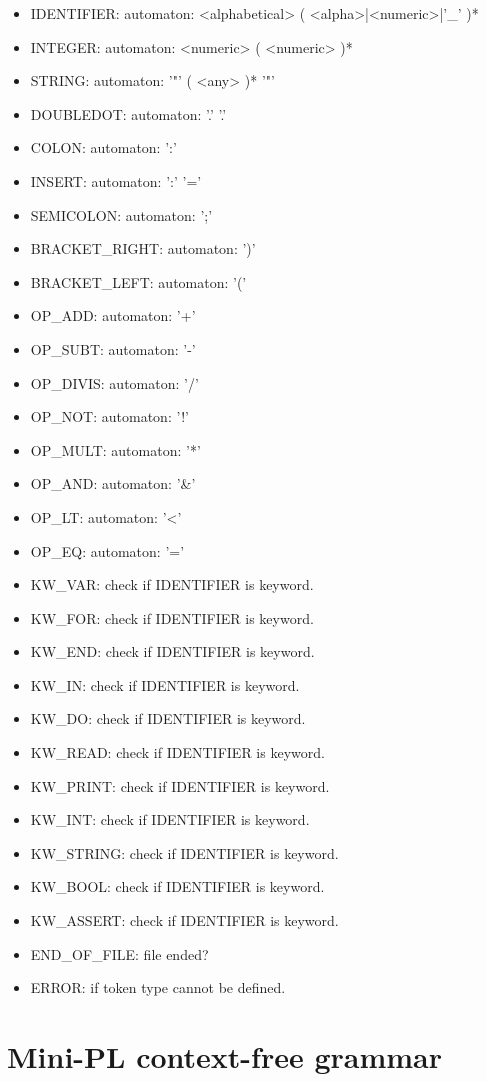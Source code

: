 \documentclass[english,11pt,twoside,a4paper]{article}
\begin{document}
\begin{itemize}
	\item IDENTIFIER: automaton: <alphabetical> ( <alpha>|<numeric>|'\_' )*
	\item INTEGER: automaton: <numeric> ( <numeric> )*
	\item STRING: automaton: '"' ( <any> )* '"'
	\item DOUBLEDOT: automaton: '.' '.'
	\item COLON: automaton: ':'
	\item INSERT: automaton: ':' '='
	\item SEMICOLON: automaton: ';'
	\item BRACKET\_RIGHT: automaton: ')'
	\item BRACKET\_LEFT: automaton: '('
	\item OP\_ADD: automaton: '+'
	\item OP\_SUBT: automaton: '-'
	\item OP\_DIVIS: automaton: '/'
	\item OP\_NOT: automaton: '!'
	\item OP\_MULT: automaton: '*'
	\item OP\_AND: automaton: '\&'
	\item OP\_LT: automaton: '<'
	\item OP\_EQ: automaton: '='
	\item KW\_VAR: check if IDENTIFIER is keyword.
	\item KW\_FOR: check if IDENTIFIER is keyword.
	\item KW\_END: check if IDENTIFIER is keyword.
	\item KW\_IN: check if IDENTIFIER is keyword.
	\item KW\_DO: check if IDENTIFIER is keyword.
	\item KW\_READ: check if IDENTIFIER is keyword.
	\item KW\_PRINT: check if IDENTIFIER is keyword.
	\item KW\_INT: check if IDENTIFIER is keyword.
	\item KW\_STRING: check if IDENTIFIER is keyword.
	\item KW\_BOOL: check if IDENTIFIER is keyword.
	\item KW\_ASSERT: check if IDENTIFIER is keyword.
	\item END\_OF\_FILE: file ended?
	\item ERROR: if token type cannot be defined.
\end{itemize}

\section{Mini-PL context-free grammar}
\end{document}
